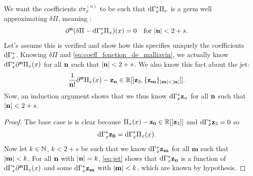 We want the coefficients $\dd \pi^{(n)}_x$ to be such that $\mathrm{d}\Gamma^*_x \Pi_x$ is a germ well approximating $\delta \Pi$, meaning :
\begin{equation}
    \partial^{\mathbf{n}} (\delta \Pi - \mathrm{d}\Gamma^*_x \Pi_x)(x)=0 \quad \text{for }\vert \mathbf{n} \vert < 2+s.
    \label{eq:coeff_fonction_de_malliavin}
\end{equation}
Let's assume this is verified and show how this specifies uniquely the coefficients $\mathrm{d}\Gamma^*_x$. 
Knowing $\delta \Pi$ and \eqref{eq:coeff_fonction_de_malliavin}, we actually know $\mathrm{d}\Gamma^*_x \partial^{\mathbf{n}}\Pi_x(x)$ for all $\mathbf{n}$ such that $\lvert\mathbf{n}\rvert<2+s$.
We also know this fact about the jet:
\begin{equation}
    \frac{1}{\mathbf{n} !}\partial^{\mathbf{n}}\Pi_x(x) - \mathbf{z}_{\mathbf{n}} \in \mathbb{R}[[\mathbf{z}_3, \{\mathbf{z_\mathbf{m}}\}_{\lvert\mathbf{m}\rvert<\lvert\mathbf{n}\rvert}]].
    \label{eq:jet}
\end{equation}
Now, an induction argument shows that we thus know $\mathrm{d}\Gamma^*_x \mathbf{z}_n$ for all $\mathbf{n}$ such that $\lvert\mathbf{n}\rvert<2+s$.
\begin{proof}
The base case is is clear because $\Pi_x(x) - \mathbf{z}_{\mathbf{0}} \in \mathbb{R}[[\mathbf{z}_3]]$ and $\mathrm{d}\Gamma^*_x \mathbf{z}_3 = 0$ so 
$$\mathrm{d}\Gamma^*_x \mathbf{z}_{\mathbf{0}}=\mathrm{d}\Gamma^*_x \Pi_x(x).$$
Now let $k\in \mathbb{N}$, $k<2+s$ be such that we know $\mathrm{d}\Gamma^*_x \mathbf{z}_{\mathbf{m}}$ for all $\mathbf{m}$ such that $\lvert\mathbf{m}\rvert<k$.
For all $\mathbf{n}$ with $\lvert\mathbf{n}\rvert = k$, \eqref{eq:jet} shows that $\mathrm{d}\Gamma^*_x \mathbf{z}_{\mathbf{n}}$ is a function of $\mathrm{d}\Gamma^*_x \partial^{\mathbf{n}}\Pi_x(x)$ and some $\mathrm{d}\Gamma^*_x \mathbf{z}_{\mathbf{m}}$ with $\lvert\mathbf{m}\rvert<k$, which are known by hypothesis.

\end{proof}

